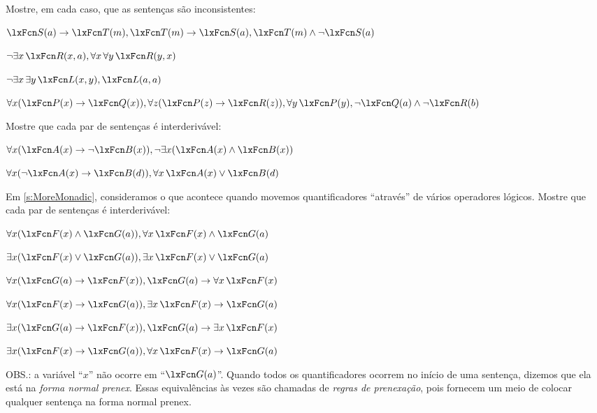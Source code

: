\practiceproblems
\problempart
Mostre, em cada caso, que as sentenças são inconsistentes:
\begin{compactlist}
\item $\atom{S}{a}\eif \atom{T}{m}, \atom{T}{m} \eif \atom{S}{a}, \atom{T}{m} \eand \enot \atom{S}{a}$
\item $\enot\exists x\,\atom{R}{x,a}, \forall x\, \forall y\,\atom{R}{y,x}$
\item $\enot\exists x\, \exists y\,\atom{L}{x,y}, \atom{L}{a,a}$
\item $\forall x(\atom{P}{x} \eif \atom{Q}{x}), \forall z(\atom{P}{z} \eif \atom{R}{z}), \forall y\,\atom{P}{y}, \enot \atom{Q}{a} \eand \enot \atom{R}{b}$
\end{compactlist}

\problempart
Mostre que cada par de sentenças é interderivável:
\begin{compactlist}
\item $\forall x (\atom{A}{x}\eif \enot \atom{B}{x}), \enot\exists x(\atom{A}{x} \eand \atom{B}{x})$
\item $\forall x (\enot\atom{A}{x}\eif \atom{B}{d}), \forall x\,\atom{A}{x} \eor \atom{B}{d}$
\end{compactlist}

\problempart
Em \cref{s:MoreMonadic}, consideramos o que acontece quando movemos quantificadores \textquotedblleft através\textquotedblright{} de vários operadores lógicos. Mostre que cada par de sentenças é interderivável:
\begin{compactlist}
\item $\forall x(\atom{F}{x} \eand \atom{G}{a}), \forall x\,\atom{F}{x} \eand \atom{G}{a}$
\item $\exists x(\atom{F}{x} \eor \atom{G}{a}), \exists x\,\atom{F}{x} \eor \atom{G}{a}$
\item $\forall x(\atom{G}{a} \eif \atom{F}{x}), \atom{G}{a} \eif \forall x\,\atom{F}{x}$
\item $\forall x(\atom{F}{x} \eif \atom{G}{a}), \exists x\,\atom{F}{x} \eif \atom{G}{a}$
\item $\exists x(\atom{G}{a} \eif \atom{F}{x}), \atom{G}{a} \eif \exists x\,\atom{F}{x}$
\item $\exists x(\atom{F}{x} \eif \atom{G}{a}), \forall x\,\atom{F}{x} \eif \atom{G}{a}$
\end{compactlist}
OBS.: a variável \textquotedblleft $x$\textquotedblright{} não ocorre em \textquotedblleft $\atom{G}{a}$\textquotedblright{}. Quando todos os quantificadores ocorrem no início de uma sentença, dizemos que ela está na \emph{forma normal prenex}. Essas equivalências às vezes são chamadas de \emph{regras de prenexação}, pois fornecem um meio de colocar qualquer sentença na forma normal prenex.


